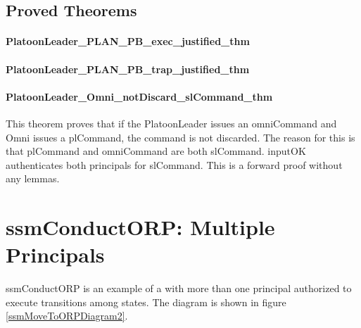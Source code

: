 \documentclass[../../main/main.tex]{subfiles}
\begin{document}
\HOLPBIntegratedDefDefinitionssecAuthorizationXXdef

\HOLPBIntegratedDefDefinitionssecHelperXXdef


\subsection{Proved Theorems}

\paragraph*{PlatoonLeader_PLAN_PB_exec_justified_thm}
\HOLssmPBIntegratedTheoremsPlatoonLeaderXXPLANXXPBXXexecXXjustifiedXXthm
\HOLssmPBIntegratedTheoremsPlatoonLeaderXXPLANXXPBXXexecXXlemma

\paragraph*{PlatoonLeader_PLAN_PB_trap_justified_thm}
\HOLssmPBIntegratedTheoremsPlatoonLeaderXXPLANXXPBXXtrapXXjustifiedXXlemma
\HOLssmPBIntegratedTheoremsPlatoonLeaderXXPLANXXPBXXtrapXXjustifiedXXthm
\HOLssmPBIntegratedTheoremsPlatoonLeaderXXPLANXXPBXXtrapXXlemma

\paragraph*{PlatoonLeader_Omni_notDiscard_slCommand_thm}
This theorem proves that if the PlatoonLeader issues an omniCommand and Omni issues a plCommand, the command is not discarded.  The reason for this is that plCommand and omniCommand are both slCommand.  inputOK authenticates both principals for slCommand.  This is a forward proof without any lemmas.

\HOLssmPBIntegratedTheoremsPlatoonLeaderXXOmniXXnotDiscardXXslCommandXXthm

     
\section{ssmConductORP: Multiple Principals}
ssmConductORP is an example of a  with more than one principal authorized to execute transitions among states. The diagram is shown in figure \ref{ssmMoveToORPDiagram2}.
\end{document}
